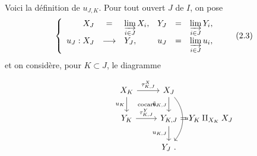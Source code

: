 \documentclass[11pt]{article}
\newcommand{\printedpage}[1]{\marginpar{\footnotesize p.~#1}}
\newcommand{\msp}[1]{\marginpar{\footnotesize [#1]}}
\begin{document}
Voici la définition de $u_{J,K}$. Pour tout ouvert $J$ de $I$, on pose
\[
\left\{
\begin{array}{rclrcl}
X_J & = & \varinjlim\limits_{i\in J} X_i, & Y_J & = & \varinjlim\limits_{i\in J} Y_i,\\[2ex]
u_J : X_J & \longrightarrow & Y_J, & u_J & = & \varinjlim\limits_{i\in J} u_i,
\end{array}
\right.
\tag*{(2.3)}
\]
et on considère, pour $K \subset J$, le diagramme

\printedpage{15}

\msp{page 26}

\[
\begin{tikzcd}
X_K \arrow[r, "\tau^X_{K,J}"] \arrow[d, "u_K"'] \arrow[dr, phantom, "\text{\scriptsize cocart.}"] & X_J \arrow[d, "\tilde{u}_{K,J}"'] \arrow[dd, bend left=40, "u_J"] \\
Y_K \arrow[r, "\tau^Y_{K,J}"] & Y_{K,J} \rlap{$\ = Y_K \amalg_{X_K} X_J$} \arrow[d, "u_{K,J}"'] \\
 & Y_J \ .
\end{tikzcd}
\]
\end{document}
